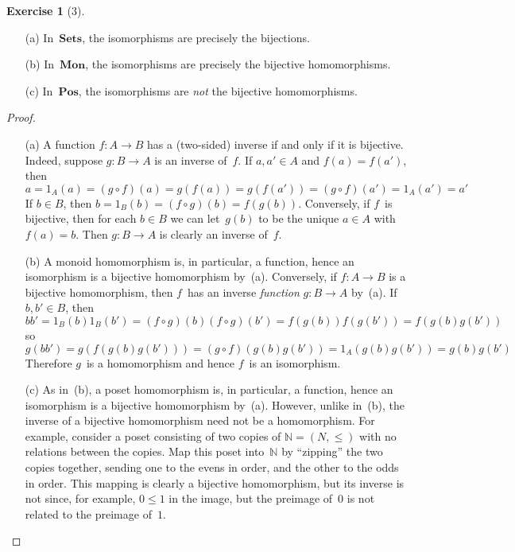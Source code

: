 \documentclass[letterpaper,12pt]{article}
\newcommand{\N}{\mathbb{N}}
\newcommand{\Sets}{\mathbf{Sets}}
\newcommand{\Mon}{\mathbf{Mon}}
\newcommand{\Pos}{\mathbf{Pos}}
\newcommand{\after}{\circ}
\theoremstyle{definition}
\newtheorem*{exer}{Exercise}
\theoremstyle{remark}
\theoremstyle{direction}
\begin{document}
\begin{exer}[3]\
\begin{enumerate}[itemsep=0pt]
\item[(a)] In~\(\Sets\), the isomorphisms are precisely the bijections.
\item[(b)] In~\(\Mon\), the isomorphisms are precisely the bijective homomorphisms.
\item[(c)] In~\(\Pos\), the isomorphisms are \emph{not} the bijective homomorphisms.
\end{enumerate}
\begin{proof}\
\begin{enumerate}
\item[(a)] A function \(f:A\to B\) has a (two-sided) inverse if and only if it is bijective. Indeed, suppose \(g:B\to A\) is an inverse of~\(f\). If \(a,a'\in A\) and \(f(a)=f(a')\), then
\[a=1_A(a)=(g\after f)(a)=g(f(a))=g(f(a'))=(g\after f)(a')=1_A(a')=a'\]
If \(b\in B\), then \(b=1_B(b)=(f\after g)(b)=f(g(b))\). Conversely, if \(f\)~is bijective, then for each \(b\in B\) we can let~\(g(b)\) to be the unique \(a\in A\) with \(f(a)=b\). Then \(g:B\to A\) is clearly an inverse of~\(f\).
\item[(b)] A monoid homomorphism is, in particular, a function, hence an isomorphism is a bijective homomorphism by~(a). Conversely, if \(f:A\to B\) is a bijective homomorphism, then \(f\)~has an inverse \emph{function} \(g:B\to A\) by~(a). If \(b,b'\in B\), then
\[bb'=1_B(b)1_B(b')=(f\after g)(b)(f\after g)(b')=f(g(b))f(g(b'))=f(g(b)g(b'))\]
so
\[g(bb')=g(f(g(b)g(b')))=(g\after f)(g(b)g(b'))=1_A(g(b)g(b'))=g(b)g(b')\]
Therefore \(g\)~is a homomorphism and hence \(f\)~is an isomorphism.
\item[(c)] As in~(b), a poset homomorphism is, in particular, a function, hence an isomorphism is a bijective homomorphism by~(a). However, unlike in~(b), the inverse of a bijective homomorphism need not be a homomorphism. For example, consider a poset consisting of two copies of \(\N=(N,\le)\) with no relations between the copies. Map this poset into~\(\N\) by ``zipping'' the two copies together, sending one to the evens in order, and the other to the odds in order. This mapping is clearly a bijective homomorphism, but its inverse is not since, for example, \(0\le 1\) in the image, but the preimage of~\(0\) is not related to the preimage of~\(1\).\qedhere
\end{enumerate}
\end{proof}
\end{exer}
\end{document}
